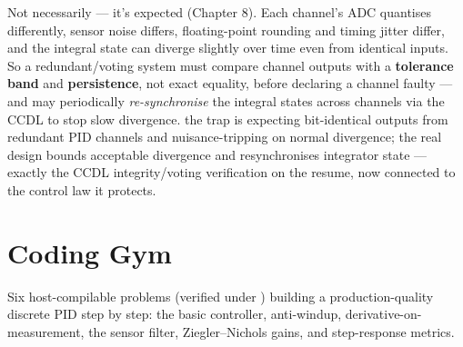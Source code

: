 Not necessarily --- it's expected (Chapter 8). Each channel's ADC quantises
differently, sensor noise differs, floating-point rounding and timing jitter
differ, and the integral state can diverge slightly over time even from
identical inputs. So a redundant/voting system must compare channel outputs with
a \textbf{tolerance band} and \textbf{persistence}, not exact equality, before
declaring a channel faulty --- and may periodically \emph{re-synchronise} the
integral states across channels via the CCDL to stop slow divergence. \trap the
trap is expecting bit-identical outputs from redundant PID channels and
nuisance-tripping on normal divergence; the real design bounds acceptable
divergence and resynchronises integrator state --- exactly the CCDL
integrity/voting verification on the resume, now connected to the control law it
protects.

\section{Coding Gym}

\begin{partnote}
Six host-compilable problems (verified under
) building a production-quality discrete
PID step by step: the basic controller, anti-windup, derivative-on-measurement,
the sensor filter, Ziegler--Nichols gains, and step-response metrics.
\end{partnote}

